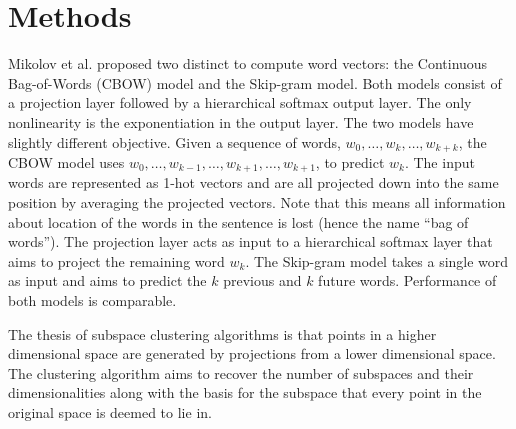 \section{Methods}\label{sec:methods}

Mikolov et al. proposed two distinct to compute word vectors: the Continuous Bag-of-Words (CBOW) model and the Skip-gram model. 
Both models consist of a projection layer followed by a hierarchical softmax output layer. 
The only nonlinearity is the exponentiation in the output layer. 
The two models have slightly different objective. 
Given a sequence of words, $w_0, \hdots , w_k, \hdots, w_{k+k}$, the CBOW model uses $w_0, \hdots, w_{k-1}, \hdots, w_{k+1}, \hdots, w_{k+1}$, to predict $w_k$. 
The input words are represented as 1-hot vectors and are all projected down into the same position by averaging the projected vectors. 
Note that this means all information about location of the words in the sentence is lost (hence the name “bag of words”). 
The projection layer acts as input to a hierarchical softmax layer that aims to project the remaining word $w_k$. 
The Skip-gram model takes a single word as input and aims to predict the $k$ previous and $k$ future words. 
Performance of both models is comparable.

	The thesis of subspace clustering algorithms is that points in a higher dimensional space are generated by projections from a lower dimensional space. The clustering algorithm aims to recover the number of subspaces and their dimensionalities along with the basis for the subspace that every point in the original space is deemed to lie in. 
